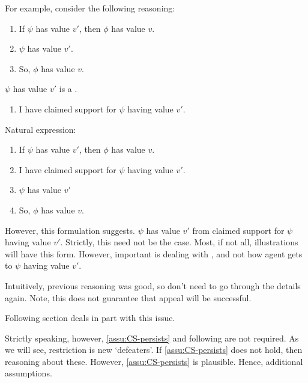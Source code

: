 \begin{note}
  For example, consider the following reasoning:

  \begin{enumerate}
  \item If \(\psi\) has value \(v'\), then \(\phi\) has value \(v\).
  \item \(\psi\) has value \(v'\).
  \item So, \(\phi\) has value \(v\).
  \end{enumerate}

  \(\psi\) has value \(v'\) is a \requ{}.

  \begin{enumerate}
  \item I have claimed support for \(\psi\) having value \(v'\).
  \end{enumerate}

  Natural expression:

  \begin{enumerate}
  \item If \(\psi\) has value \(v'\), then \(\phi\) has value \(v\).
  \item I have claimed support for \(\psi\) having value \(v'\).
  \item \(\psi\) has value \(v'\)
  \item So, \(\phi\) has value \(v\).
  \end{enumerate}

  However, this formulation suggests.
  \(\psi\) has value \(v'\) from claimed support for \(\psi\) having value \(v'\).
  Strictly, this need not be the case.
  Most, if not all, illustrations will have this form.
  However, important is dealing with \requ{}, and not how agent gets to \(\psi\) having value \(v'\).
\end{note}

\begin{note}
  Intuitively, previous reasoning was good, so don't need to go through the details again.
  Note, this does not guarantee that appeal will be successful.

  Following section deals in part with this issue.
\end{note}

\begin{note}
  Strictly speaking, however, \autoref{assu:CS-persists} and following are not required.
  As we will see, restriction is new `defeaters'.
  If \autoref{assu:CS-persists} does not hold, then reasoning about these.
  However, \autoref{assu:CS-persists} is plausible.
  Hence, additional assumptions.
\end{note}

